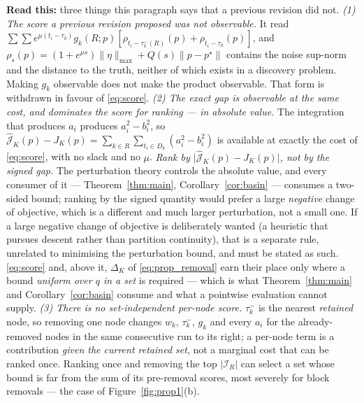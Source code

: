 \documentclass[11pt]{article}
\theoremstyle{remark}\newtheorem{remark}{Remark}
\newcommand{\pstar}{p^\star}
\newcommand{\norm}[1]{\lVert #1\rVert}
\newcommand{\hatJ}{\hat{\mathcal J}}
\newcommand{\readthis}[1]{\textbf{Read this:} #1}
\begin{document}
\readthis{three things this paragraph says that a previous revision did not.
\emph{(1) The score a previous revision proposed was not observable.} It read $\sum\sum e^{\mu(t_i-\tau_k)}g_k(R;p)[\rho_{t_i-\tau_k^{-}(R)}(p)+\rho_{t_i-\tau_k}(p)]$, and $\rho_s(p)=(1+e^{\mu s})\norm\eta_{\max}+Q(s)\norm{p-\pstar}$ contains the noise sup-norm and the distance to the truth, neither of which exists in a discovery problem. Making $g_k$ observable does not make the product observable. That form is withdrawn in favour of \eqref{eq:score}.
\emph{(2) The exact gap is observable at the same cost, and dominates the score for ranking --- in absolute value.} The integration that produces $a_i$ produces $a_i^2-b_i^2$, so $\hatJ_K(p)-J_K(p)=\sum_{k\in R}\sum_{t_i\in D_k}(a_i^2-b_i^2)$ is available at exactly the cost of \eqref{eq:score}, with no slack and no $\mu$. \emph{Rank by $\big|\hatJ_K(p)-J_K(p)\big|$, not by the signed gap.} The perturbation theory controls the absolute value, and every consumer of it --- Theorem~\ref{thm:main}, Corollary~\ref{cor:basin} --- consumes a two-sided bound; ranking by the signed quantity would prefer a large \emph{negative} change of objective, which is a different and much larger perturbation, not a small one. If a large negative change of objective is deliberately wanted (a heuristic that pursues descent rather than partition continuity), that is a separate rule, unrelated to minimising the perturbation bound, and must be stated as such. \eqref{eq:score} and, above it, $\Delta_K$ of \eqref{eq:prop_removal} earn their place only where a bound \emph{uniform over $q$ in a set} is required --- which is what Theorem~\ref{thm:main} and Corollary~\ref{cor:basin} consume and what a pointwise evaluation cannot supply.
\emph{(3) There is no set-independent per-node score.} $\tau_k^{-}$ is the nearest \emph{retained} node, so removing one node changes $w_k$, $\tau_k^{-}$, $g_k$ and every $a_i$ for the already-removed nodes in the same consecutive run to its right; a per-node term is a contribution \emph{given the current retained set}, not a marginal cost that can be ranked once. Ranking once and removing the top $|\mathcal I_R|$ can select a set whose bound is far from the sum of its pre-removal scores, most severely for block removals --- the case of Figure~\ref{fig:prop1}(b).}
\end{document}
